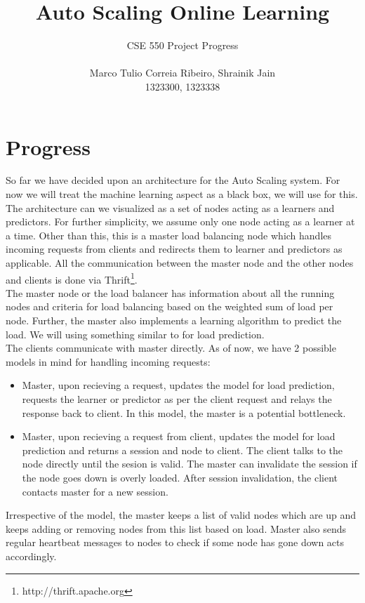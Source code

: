 \documentclass[letterpaper]{article}
\title{Auto Scaling Online Learning}
\date{}
\begin{document}
\author{CSE 550 Project Progress \\\\ Marco Tulio Correia Ribeiro, Shrainik Jain\\ 1323300, 1323338}
\maketitle

\section{Progress}
So far we have decided upon an architecture for the Auto Scaling system. For now we will treat the machine learning aspect as a black box, we will use \cite{MachineLearningSystem} for this.
The architecture can we visualized as a set of nodes acting as a learners and predictors. For further simplicity, we assume only one node acting as a learner at a time. Other than this, this is a master load balancing node 
which handles incoming requests from clients and redirects them to learner and predictors as applicable. All the communication between the master node and the other nodes and clients is done via Thrift\footnote{http://thrift.apache.org}. 
\\
The master node or the load balancer has information about all the running nodes and criteria for load balancing based on the weighted sum of load per node. Further, the master also implements a learning algorithm to predict the load. We will using something similar to \cite{LoadPrediction} for load prediction. 
\\
The clients communicate with master directly. As of now, we have 2 possible models in mind for handling incoming requests:
\begin{itemize}
\item Master, upon recieving a request, updates the model for load prediction, requests the learner or predictor as per the client request and relays the response back to client. In this model, the master is a potential bottleneck.
\item Master, upon recieving a request from client, updates the model for load prediction and returns a session and node to client. The client talks to the node directly until the sesion is valid. The master can invalidate the session if the node goes down is overly loaded. After session invalidation, the client contacts master for a new session.
\end{itemize}

Irrespective of the model, the master keeps a list of valid nodes which are up and keeps adding or removing nodes from this list based on load. Master also sends regular heartbeat messages to nodes to check if some node has gone down acts accordingly.




\end{document}

